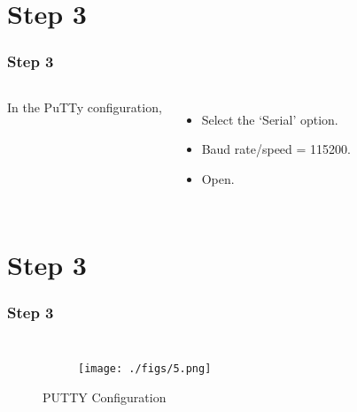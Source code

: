 \documentclass{beamer}
\begin{document}
\section{Step 3}
\begin{frame}
\frametitle{Step 3}
\begin{columns}
In the PuTTy configuration,
  \begin{itemize}
  \item  Select the ‘Serial’ option.
  \vspace{10pt}
  \item Baud rate/speed = 115200.
  \vspace{10pt}
  \item Open.
  
  \end{itemize}
  
\end{columns}



\end{frame}

\section{Step 3}
\begin{frame}
\frametitle{Step 3}
\begin{columns}

  \begin{figure}[h!]
  \centering
  \begin{subfigure}[b]{0.5\linewidth}
    \texttt{[image: ./figs/5.png]}
  \end{subfigure}

  \caption{PUTTY Configuration}
\end{figure}
\end{columns}



\end{frame}
\end{document}
